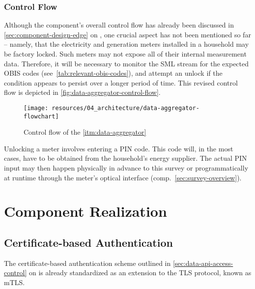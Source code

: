 \subsubsection{Control Flow}
\label{sec:data-aggregator-control-flow}

Although the component's overall control flow has already been discussed in \autoref{sec:component-design-edge} on , one crucial aspect has not been mentioned so far -- namely, that the electricity and generation meters installed in a household may be factory locked. Such meters may not expose all of their internal measurement data. Therefore, it will be necessary to monitor the \acs{SML} stream for the expected \acs{OBIS} codes (see~\autoref{tab:relevant-obis-codes}), and attempt an unlock if the condition appears to persist over a longer period of time. This revised control flow is depicted in \autoref{fig:data-aggregator-control-flow}.

\begin{figure}[hbt]
  \centering
  \texttt{[image: resources/04\_architecture/data-aggregator-flowchart]}
  \caption{Control flow of the \ref*{itm:data-aggregator}}
  \label{fig:data-aggregator-control-flow}
\end{figure}

\FloatBarrier

Unlocking a meter involves entering a \acs{PIN} code. This code will, in the most cases, have to be obtained from the household's energy supplier. The actual \acs{PIN} input may then happen physically in advance to this survey or programmatically at runtime through the meter's optical interface (comp.~\autoref{sec:survey-overview}).


\section{Component Realization}
\label{sec:component-realization}


\subsection{Certificate-based Authentication}
\label{sec:certificate-based-authentication}

The certificate-based authentication scheme outlined in \autoref{sec:data-api-access-control} on  is already standardized as an extension to the \acs{TLS} protocol, known as \ac{mTLS}.


